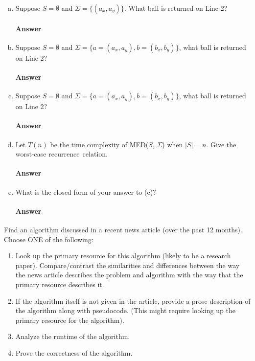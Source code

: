 \documentclass{article}
\begin{document}
\begin{enumerate}[(a)]
    \item
        Suppose $S=\emptyset$ and $\Sigma=\{ (a_x,a_y)\}$. What ball is returned on Line 2?
        \paragraph{Answer}
    \item
        Suppose $S=\emptyset$ and $\Sigma=\{ a=(a_x,a_y),b=(b_x,b_y)\}$, what ball is returned on Line 2?
        \paragraph{Answer}
    \item
        Suppose $S=\emptyset$ and $\Sigma=\{ a=(a_x,a_y),b=(b_x,b_y)\}$, what ball is returned on Line 2?
        \paragraph{Answer}

    \item Let $T(n)$ be the time complexity of MED($S$, $\Sigma$) when
        $|S|=n$.  Give the worst-case recurrence~relation.
        \paragraph{Answer}
    \item What is the closed form of your answer to (c)?
        \paragraph{Answer}
\end{enumerate}



Find an algorithm discussed in a recent news article (over the past 12 months).
Choose ONE of the following:
\begin{enumerate}
    \item Look up the primary resource for this algorithm (likely to be a
        research paper).  Compare/contrast the similarities and differences between the
        way the news article describes the problem and algorithm with the way
        that the primary resource describes it.
    \item If the algorithm itself is not given in the article, provide a prose
        description of the algorithm along with pseudocode. (This might require
        looking up the primary resource for the algorithm).
    \item Analyze the runtime of the algorithm.
    \item Prove the correctness of the algorithm.
\end{enumerate}
\end{document}

